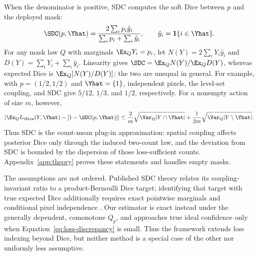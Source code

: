 When the denominator is positive, SDC computes the soft Dice between \(p\)
and the deployed mask:
\begin{equation}
  \SDC(p,\Yhat)
  =
  \frac{2\sum_i p_i\hat y_i}
       {\sum_i p_i+\sum_i\hat y_i},
  \qquad
  \hat y_i=\mathbf 1\{i\in\Yhat\}.
  \label{eq:sdc}
\end{equation}
For any mask law \(Q\) with marginals \(\Ex_QY_i=p_i\), let
\(N(Y)=2\sum_iY_i\hat y_i\) and \(D(Y)=\sum_iY_i+\sum_i\hat y_i\).
Linearity gives \(\SDC=\Ex_QN(Y)/\Ex_QD(Y)\), whereas expected Dice is
\(\Ex_Q[N(Y)/D(Y)]\); the two are unequal in general. For example, with
\(p=(1/2,1/2)\) and \(\Yhat=\{1\}\), independent pixels, the level-set
coupling, and SDC give \(5/12\), \(1/3\), and \(1/2\), respectively.
For a nonempty action of size \(m\), however,
\begin{equation*}
  \left|\Ex_Q L_{\Dice}(Y,\Yhat)-[1-\SDC(p,\Yhat)]\right|
  \leq \frac{2}{m}\sqrt{\Var_Q |Y\cap\Yhat|}
       +\frac{1}{2m}\sqrt{\Var_Q |Y\setminus\Yhat|}.
\end{equation*}
Thus SDC is the count-mean plug-in approximation: spatial coupling affects
posterior Dice only through the induced two-count law, and the deviation from
SDC is bounded by the dispersion of those loss-sufficient counts.
Appendix~\ref{app:theory} proves these statements and handles empty masks.

The assumptions are not ordered. Published SDC theory relates its
coupling-invariant ratio to a product-Bernoulli Dice target; identifying that
target with true expected Dice additionally requires exact pointwise marginals
and conditional pixel independence \citep{sdc}. Our estimator is exact instead
under the generally dependent, comonotone \(Q_p\), and approaches true ideal
confidence only when Equation~\eqref{eq:loss-discrepancy} is small. Thus the
framework extends loss indexing beyond Dice, but neither method is a special
case of the other nor uniformly less assumptive.
